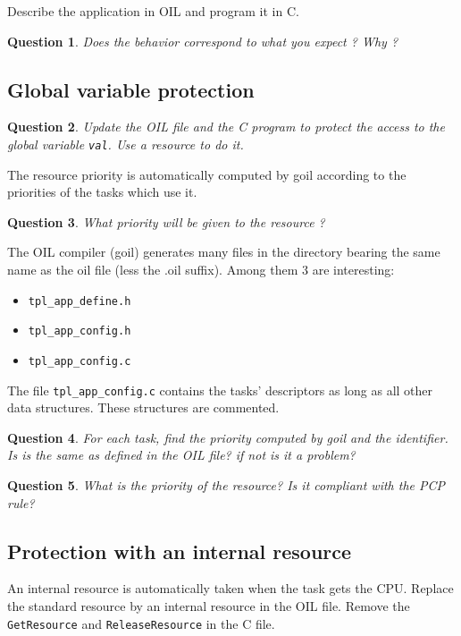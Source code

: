 \documentclass[11pt]{article}
\newtheorem{ex}{Question}
\begin{document}
Describe the application in OIL and program it in C.

\begin{ex}
Does the behavior correspond to what you expect ? Why ?
\end{ex}

\subsection{Global variable protection}

\begin{ex}
Update the OIL file and the C program to protect the access to the global variable \texttt{val}. Use a resource to do it.
\end{ex}

The resource priority is automatically computed by goil according to the priorities of the tasks which use it.

\begin{ex}
What priority will be given to the resource ?
\end{ex}

The OIL compiler (goil) generates many files in the directory bearing the same name
as the oil file (less the .oil suffix). Among them 3 are interesting:
\begin{itemize}
\item \texttt{tpl_app_define.h}
\item \texttt{tpl_app_config.h}
\item \texttt{tpl_app_config.c}
\end{itemize}

The file \texttt{tpl_app_config.c} contains the tasks' descriptors as long as all other data structures. These structures are commented.

\begin{ex}
For each task, find the priority computed by goil and the identifier. Is is the same as defined in the OIL file? if not is it a problem?
\end{ex}

\begin{ex}
What is the priority of the resource? Is it compliant with the PCP rule?
\end{ex}

\subsection{Protection with an internal resource}

An internal resource is automatically taken when the task gets the CPU. Replace the standard resource by an internal resource in the OIL file. Remove the \texttt{GetResource} and \texttt{ReleaseResource} in the C file.
\end{document}
